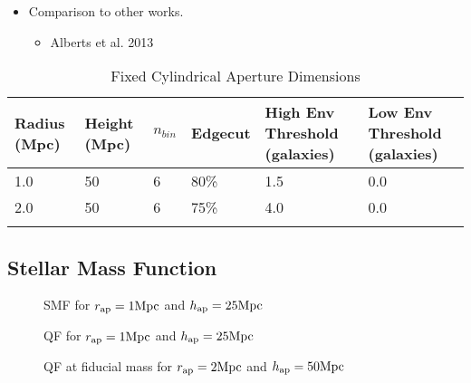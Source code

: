 \documentclass{emulateapj}
\begin{document}
\begin{itemize}
    \item Comparison to other works. 
    \begin{itemize}
        \item Alberts et al. 2013 
    \end{itemize}
\end{itemize}

%
%


\appendix
\begin{table*} %
  \caption{Fixed Cylindrical Aperture Dimensions}
  \label{tab:aperture}
  \begin{center}
    \leavevmode
    \begin{tabular}{llllll} \hline \hline              
  Radius (Mpc)          &Height (Mpc)      &$n_{bin}$   &Edgecut &High Env Threshold (galaxies) &Low Env Threshold (galaxies) \\ \hline 
  1.0 &50 &6 & 80\% & 1.5 & 0.0          \\
  2.0 &50 &6 & 75\% & 4.0 & 0.0          \\ \hline
  \multicolumn{6}{l}{}                                             \\       
    \end{tabular}
  \end{center}
\end{table*}

\subsection{Stellar Mass Function} \label{sec:smf_const}
\begin{figure*}
    \begin{center}
        \leavevmode
        \label{fig:smf}
        \caption{SMF for $r_{\rm{ap}}=1 \rm{Mpc}$ and $h_{\rm{ap}}=25 \rm{Mpc}$}
    \end{center}
\end{figure*}

\begin{figure*}
    \begin{center}
        \leavevmode
        \label{fig:smf}
        \caption{QF for $r_{\rm{ap}}=1 \rm{Mpc}$ and $h_{\rm{ap}}=25 \rm{Mpc}$}
    \end{center}
\end{figure*}

\begin{figure*}
    \begin{center}
        \leavevmode
        \label{fig:qf}
        \caption{QF at fiducial mass for $r_{\rm{ap}}=2 \rm{Mpc}$ and $h_{\rm{ap}}=50 \rm{Mpc}$}
    \end{center}
\end{figure*}
\end{document}
